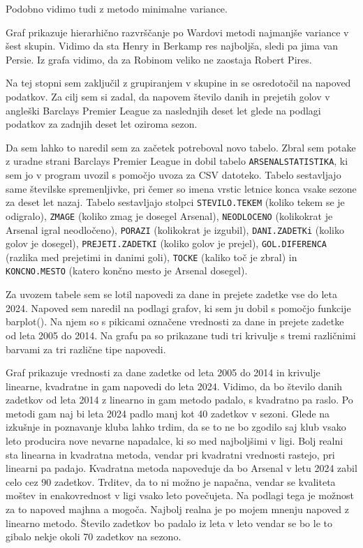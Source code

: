 \documentclass[11pt,a4paper]{article}
\begin{document}
Podobno vidimo tudi z metodo minimalne variance. 


Graf prikazuje hierarhično razvrščanje po Wardovi metodi najmanjše variance v šest skupin.
Vidimo da sta Henry in Berkamp res najboljša, sledi pa jima van Persie. Iz grafa vidimo, da za Robinom veliko ne zaostaja Robert Pires.

\newpage
Na tej stopni sem zaključil z grupiranjem v skupine in se osredotočil na napoved podatkov. Za cilj sem si zadal, da napovem število danih in prejetih golov v angleški Barclays Premier League za naslednjih deset let glede na podlagi podatkov za zadnjih deset let oziroma sezon.

Da sem lahko to naredil sem za začetek potreboval novo tabelo. Zbral sem potake z uradne strani  
Barclays Premier League in dobil tabelo \texttt{AR\-SE\-NAL\-STA\-TIST\-IKA}, ki sem jo v program uvozil s pomočjo uvoza za CSV datoteko. Tabelo sestavljajo same številske spremenljivke, pri čemer so imena vrstic letnice konca vsake sezone za deset let nazaj. Tabelo sestavljajo stolpci \verb|STEVILO.TEKEM| (koliko tekem se je odigralo), \verb|ZMAGE| (koliko zmag je dosegel Arsenal), \verb|NEODLOCENO| (kolikokrat je Arsenal igral neodločeno), \verb|PORAZI| (kolikokrat je izgubil), \verb|DANI.ZADETKi| (koliko golov je dosegel), \verb|PREJETI.ZADETKI| (koliko golov je prejel), \verb|GOL.DIFERENCA| (razlika med prejetimi in danimi goli), \verb|TOCKE| (kaliko toč je zbral) in \verb|KONCNO.MESTO| (katero končno mesto je Arsenal dosegel).

Za uvozem tabele sem se lotil napovedi za dane in prejete zadetke vse do leta 2024. Napoved sem naredil na podlagi grafov, ki sem ju dobil s pomočjo funkcije barplot(). Na njem so s pikicami označene vrednosti za dane in prejete zadetke od leta 2005 do 2014. Na grafu pa so prikazane tudi tri krivulje s tremi različnimi barvami za tri različne tipe napovedi.


Graf prikazuje vrednosti za dane zadetke od leta 2005 do 2014 in krivulje linearne, kvadratne in gam napovedi do leta 2024. Vidimo, da bo število danih zadetkov od leta 2014 z linearno in gam metodo padalo, s kvadratno pa raslo. Po metodi gam naj bi leta 2024 padlo manj kot 40 zadetkov v sezoni. Glede na izkušnje in poznavanje kluba lahko trdim, da se to ne bo zgodilo saj klub vsako leto producira nove nevarne napadalce, ki so med najboljšimi v ligi. Bolj realni sta linearna in kvadratna metoda, vendar pri kvadratni vrednosti rastejo, pri linearni pa padajo. Kvadratna metoda napoveduje da bo Arsenal v letu 2024 zabil celo cez 90 zadetkov. Trditev, da to ni možno je napačna, vendar se kvaliteta moštev in enakovrednost v ligi vsako leto povečujeta. Na podlagi tega je možnost za to napoved majhna a mogoča. Najbolj realna je po mojem mnenju napoved z linearno metodo. Število zadetkov bo padalo iz leta v leto vendar se bo le to gibalo nekje okoli 70 zadetkov na sezono. 
\end{document}
